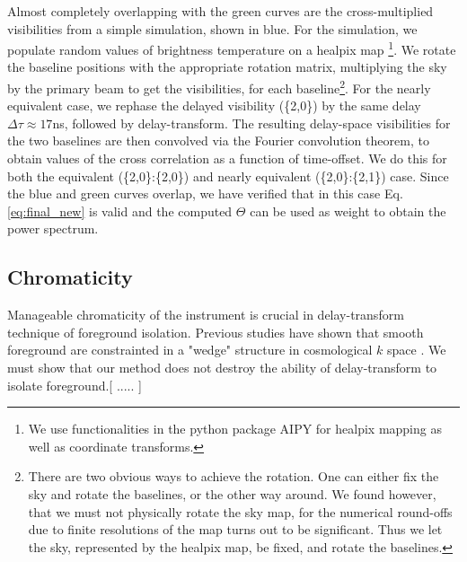 \documentclass[twocolumn,apj,numberedappendix]{emulateapj}
\renewcommand\[{\begin{equation}}
\renewcommand\]{\end{equation}}
\begin{document}
Almost completely overlapping with the green curves are the cross-multiplied visibilities from a simple simulation, shown in blue. For the simulation, we populate random values of brightness temperature
on a healpix map \citep{Heal, HealPrimer} \footnote{We use functionalities in the python package AIPY for healpix mapping
as well as coordinate transforms. }. We rotate the baseline positions with
the appropriate rotation matrix, multiplying the sky by the primary beam to get the visibilities, for each
baseline\footnote{There are two obvious ways to achieve the rotation. One
can either fix the sky and rotate the baselines, or the other way
around. We found however, that we must not physically rotate the sky
map, for the numerical round-offs due to finite resolutions of the
map turns out to be significant. Thus we let the sky, represented
by the healpix map, be fixed, and rotate the baselines. }. For the nearly equivalent case, we rephase the delayed visibility (\{2,0\}) by the same delay $\Delta\tau\approx17$ns, followed by delay-transform. The resulting delay-space visibilities for the two baselines are then convolved
via the Fourier convolution theorem, to obtain values of the cross
correlation as a function of time-offset.   We do this for both the equivalent (\{2,0\}:\{2,0\}) and nearly equivalent (\{2,0\}:\{2,1\}) case.
Since the blue and green curves overlap, we have verified that in this case Eq. \eqref{eq:final_new} is valid and the computed $\Theta$ can be used as weight to obtain the power spectrum. 


\subsection{Chromaticity \label{sec:chromaticity}}
Manageable chromaticity of the instrument is crucial in delay-transform technique of foreground isolation. Previous studies have shown that smooth foreground are constrainted in a "wedge" structure in cosmological $k$ space \citep{wedge1, wedge2}. We must show that our method does not destroy the ability of delay-transform to isolate foreground.[ ..... ]
\end{document}
